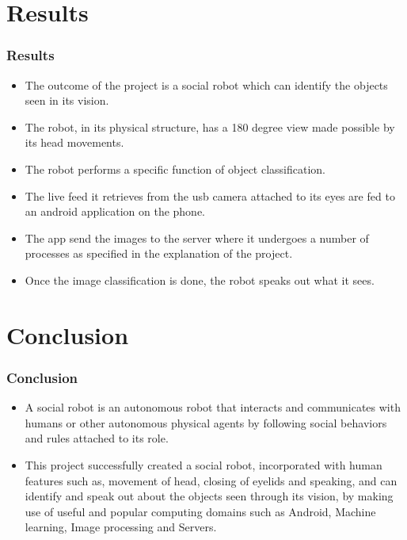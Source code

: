 \documentclass{beamer}
\begin{document}
\section{Results}
\begin{frame}
	\frametitle{Results}
	\begin{itemize}
		\item The outcome of the project is a social robot which can identify the objects seen in its vision.
		\item The robot, in its physical structure, has a 180 degree view made possible by its head movements.
		\item The robot performs a specific function of object classification.
		\item The live feed it retrieves from the usb camera attached to its eyes are fed to an android application on the phone.
		\item The app send the images to the server where it undergoes a number of processes as specified in the explanation of the project.
		\item Once the image classification is done, the robot speaks out what it sees.
	\end{itemize}
\end{frame}

\section{Conclusion}
\begin{frame}
	\frametitle{Conclusion}
	\begin{itemize}
		\item A social robot is an autonomous robot that interacts and communicates with humans or other autonomous physical agents by following social behaviors and rules attached to its role.
		\item This project successfully created a social robot, incorporated with human features such as, movement of head, closing of eyelids and speaking, and can identify and speak out about the objects seen through its vision, by making use of useful and popular computing domains such as Android, Machine learning, Image processing and Servers.
	\end{itemize}
\end{frame}
\end{document}
